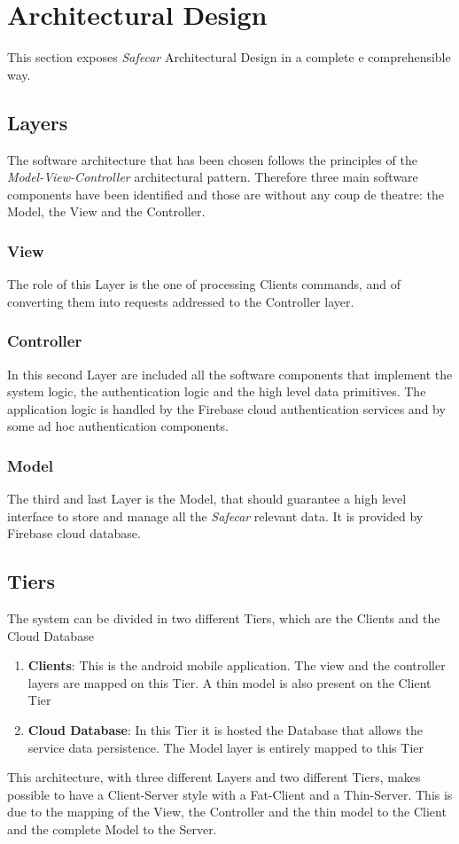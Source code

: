 \chapter{Architectural Design} \label{chap3}
This section exposes \textit{Safecar} Architectural Design in a complete e comprehensible way.

\section{Layers}
The software architecture that has been chosen follows the principles of the \textit{Model-View-Controller} architectural pattern. Therefore three main software components have been identified and those are without any coup de theatre: the Model, the View and the Controller.

\subsection{View}
The role of this Layer is the one of processing Clients commands, and of converting them into requests addressed to the Controller layer.

\subsection{Controller}
In this second Layer are included all the software components that implement the system logic, the authentication logic and the high level data primitives. The application logic is handled by the Firebase cloud authentication services and by some ad hoc authentication components.

\subsection{Model}
The third and last Layer is the Model, that should guarantee a high level interface to store and manage all the \textit{Safecar} relevant data. It is provided by Firebase cloud database.

\section{Tiers}
The system can be divided in two different Tiers, which are the Clients and the Cloud Database

\begin{enumerate}
	\item \textbf{Clients}: This is the android mobile application. The view and the controller layers are mapped on this Tier. A thin model is also present on the Client Tier
	\item \textbf{Cloud Database}: In this Tier it is hosted the Database that allows the service data persistence. The Model layer is entirely mapped to this Tier
\end{enumerate}
This architecture, with three different Layers and two different Tiers, makes possible to have a Client-Server style with a Fat-Client and a Thin-Server. This is due to the mapping of the View, the Controller and the thin model to the Client and the complete Model to the Server.

